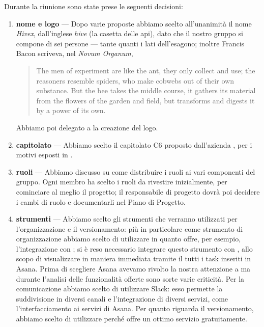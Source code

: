 Durante la riunione sono state prese le seguenti decisioni:
\begin{enumerate}
	\item \textbf{nome e logo} --- Dopo varie proposte abbiamo scelto all'unanimità il nome \emph{Hivex}, dall'inglese \emph{hive} (la casetta delle api), dato che il nostro gruppo si compone di sei persone --- tante quanti i lati dell'esagono; inoltre Francis Bacon scriveva, nel \emph{Novum Organum},
	\begin{quote}
		The men of experiment are like the ant, they only collect and use; the reasoners resemble spiders, who make cobwebs out of their own substance. But the bee takes the middle course, it gathers its material from the flowers of the garden and field, but transforms and digests it by a power of its own.
	\end{quote}
	Abbiamo poi delegato a \LB{} la creazione del logo.
	\item \textbf{capitolato} --- Abbiamo scelto il capitolato C6 \proj{} proposto dall'azienda \ZU{}, per i motivi esposti in \SdF. 
	\item \textbf{ruoli} --- Abbiamo discusso su come distribuire i ruoli ai vari componenti del gruppo. Ogni membro ha scelto i ruoli da rivestire inizialmente, per cominciare al meglio il progetto; il responsabile di progetto dovrà poi decidere i cambi di ruolo e documentarli nel Piano di Progetto.
	\item \textbf{strumenti} --- Abbiamo scelto gli strumenti che verranno utilizzati per l'organizzazione e il versionamento: più in particolare come strumento di organizzazione abbiamo scelto di utilizzare  in quanto offre, per esempio, l'integrazione con ; si è reso necessario integrare questo strumento con , allo scopo di visualizzare in maniera immediata tramite il  tutti i task inseriti in Asana. Prima di scegliere Asana avevamo rivolto la nostra attenzione a  ma durante l'analisi delle funzionalità offerte sono sorte varie criticità. Per la comunicazione abbiamo scelto di utilizzare Slack: esso permette la suddivisione in diversi canali e l'integrazione di diversi servizi, come l'interfacciamento ai servizi di Asana. Per quanto riguarda il versionamento, abbiamo scelto di utilizzare   perché offre un ottimo servizio gratuitamente.
\end{enumerate}



